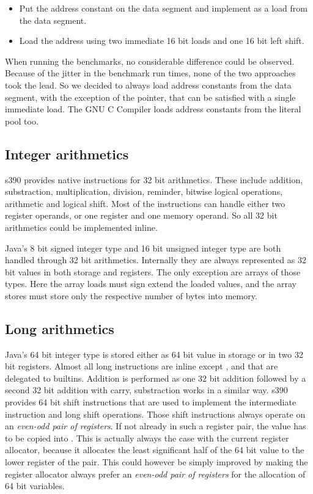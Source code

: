 \begin{itemize}
	\item Put the address constant on the data segment and implement  as a load from the data segment.
	\item Load the address using two immediate 16 bit loads and one 16 bit left shift.
\end{itemize}

When running the benchmarks, no considerable difference could be observed. Because of the jitter in the benchmark run times, none of the two approaches took the lead. So we decided to always load address constants from the data segment, with the exception of the  pointer, that can be satisfied with a single immediate load. The GNU C Compiler loads address constants from the literal pool too.

\subsection{Integer arithmetics}

s390 provides native instructions for 32 bit arithmetics. These include addition, substraction, multiplication, division, reminder, bitwise logical operations, arithmetic and logical shift. Most of the instructions can handle either two register operands, or one register and one memory operand. So all 32 bit arithmetics could be implemented inline. 

Java's 8 bit signed integer type  and 16 bit unsigned integer type  are both handled through 32 bit arithmetics. Internally they are always represented as 32 bit values in both storage and registers. The only exception are arrays of those types. Here the array loads must sign extend the loaded values, and the array stores must store only the respective number of bytes into memory.

\subsection{Long arithmetics}
\label{s390:sec:long}

Java's 64 bit integer type  is stored either as 64 bit value in storage or in two 32 bit registers. Almost all long instructions are inline except ,  and  that are delegated to builtins. Addition is performed as one 32 bit addition followed by a second 32 bit addition with carry, substraction works in a similar way. s390 provides 64 bit shift instructions that are used to implement the  intermediate instruction and long shift operations. Those shift instructions always operate on an \emph{even-odd pair of registers}. If not already in such a register pair, the value has to be copied into . This is actually always the case with the current register allocator, because it allocates the least significant half of the 64 bit value to the lower register of the pair. This could however be simply improved by making the register allocator always prefer an \emph{even-odd pair of registers} for the allocation of 64 bit variables.

